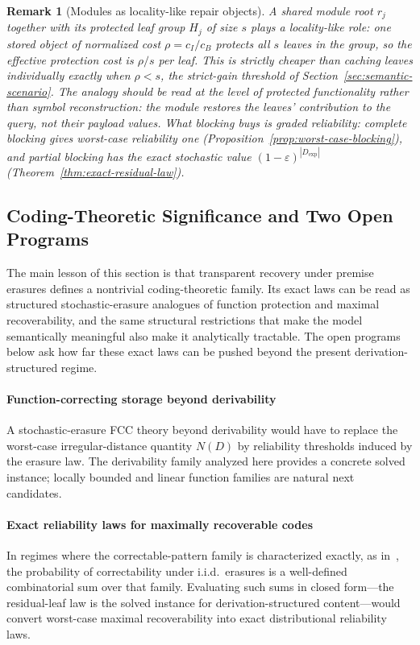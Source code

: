 \documentclass[journal]{IEEEtran}
\newtheorem{remark}{Remark}[section]
\numberwithin{equation}{section}
\begin{document}
\begin{remark}[Modules as locality-like repair objects]
\label{rem:module-as-lrc}
A shared module root \(r_j\) together with its protected leaf group
\(H_j\) of size \(s\) plays a locality-like role: one stored object of
normalized cost \(\rho=c_I/c_B\) protects all \(s\) leaves in the group, so
the effective protection cost is \(\rho/s\) per leaf.  This is strictly
cheaper than caching leaves individually exactly when \(\rho<s\), the
strict-gain threshold of Section~\ref{sec:semantic-scenario}.  The analogy
should be read at the level of protected functionality rather than symbol
reconstruction: the module restores the leaves' contribution to the query,
not their payload values.  What blocking buys is graded reliability:
complete blocking gives worst-case reliability one
(Proposition~\ref{prop:worst-case-blocking}), and partial blocking has the
exact stochastic value \((1-\varepsilon)^{|D_{\mathrm{exp}}|}\)
(Theorem~\ref{thm:exact-residual-law}).
\end{remark}

\subsection{Coding-Theoretic Significance and Two Open Programs}
\label{subsec:open-programs}

The main lesson of this section is that transparent recovery under premise
erasures defines a nontrivial coding-theoretic family.  Its exact laws can
be read as structured stochastic-erasure analogues of function protection
and maximal recoverability, and the same structural restrictions that make
the model semantically meaningful also make it analytically tractable.
The open programs below ask how far these exact laws can be pushed beyond
the present derivation-structured regime.

\paragraph*{Function-correcting storage beyond derivability}
A stochastic-erasure FCC theory beyond derivability would have to replace
the worst-case irregular-distance quantity \(N(D)\) by reliability
thresholds induced by the erasure law.  The derivability family analyzed here
provides a concrete solved instance;
locally bounded and linear function families
\cite{premlal2025function,verma2026function} are natural next candidates.

\paragraph*{Exact reliability laws for maximally recoverable codes}
In regimes where the correctable-pattern family is characterized exactly,
as in~\cite{martinez2026maximally}, the probability of correctability under
i.i.d.\ erasures is a well-defined combinatorial sum over that family.
Evaluating such sums in closed form---the residual-leaf law is the solved
instance for derivation-structured content---would convert worst-case
maximal recoverability into exact distributional reliability laws.
\end{document}
